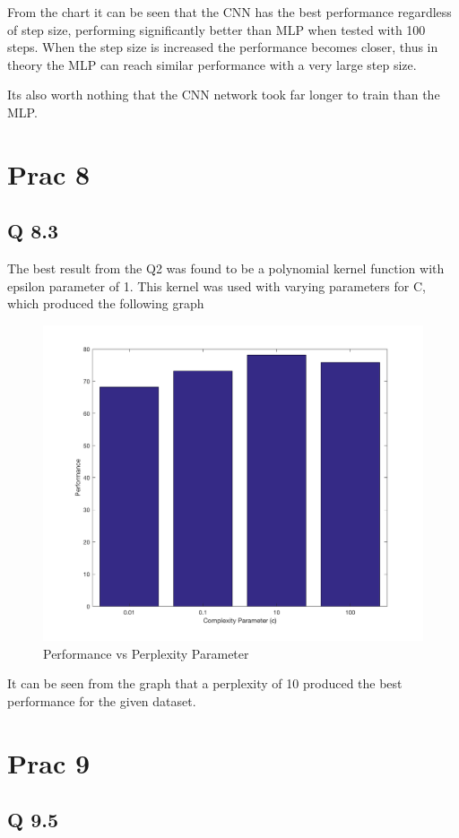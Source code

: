 From the chart it can be seen that the CNN has the best performance regardless of step size,
performing significantly better than MLP when tested with 100 steps.
When the step size is increased the performance becomes closer,
thus in theory the MLP can reach similar performance with a very large step size.

Its also worth nothing that the CNN network took far longer to train than the MLP.

\section*{Prac 8}

\subsection*{Q 8.3}

The best result from the Q2 was found to be a polynomial kernel function with epsilon parameter of 1.
This kernel was used with varying parameters for C, which produced the following graph

\begin{figure}[H]
	\centering
	\caption{Performance vs Perplexity Parameter}
	\includegraphics[width=0.7\linewidth]{../../pracs/prac8/q3}
\end{figure}

It can be seen from the graph that a perplexity of 10 produced the best performance for the given dataset.

\section*{Prac 9}

\subsection*{Q 9.5}

